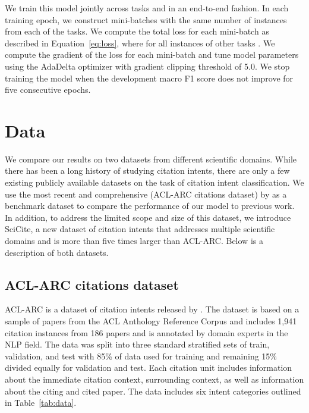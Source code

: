 \documentclass[11pt,a4paper]{article}
\newcommand{\acldata}{ACL-ARC\xspace}
\newcommand{\ourdata}{SciCite\xspace}
\begin{document}
We train this model jointly across tasks and in an end-to-end fashion.
In each training epoch, we construct mini-batches with the same number of instances from each of the  tasks. We compute the total loss for each mini-batch as described in Equation~\ref{eq:loss}, where  for all instances of other tasks .
We compute the gradient of the loss for each mini-batch and tune model parameters using the AdaDelta optimizer \cite{zeiler2012adadelta} with gradient clipping threshold of 5.0.
We stop training the model when the development macro F1 score does not improve for five consecutive epochs.



\section{Data}
\label{sec:data}


We compare our results on two datasets from different scientific domains. While there has been a long history of studying citation intents, there are only a few existing publicly available datasets on the task of citation intent classification. We use the most recent and comprehensive (\acldata citations dataset) by \citet{jurgens2018} as a benchmark dataset to compare the performance of our model to previous work. In addition, to address the limited scope and size of this dataset, we introduce \ourdata, a new dataset of citation intents that addresses multiple scientific domains and is more than five times larger than \acldata.
Below is a description of both datasets.



\subsection{ACL-ARC citations dataset}
\acldata is a dataset of citation intents released by \citet{jurgens2018}. The dataset is based on a sample of papers from the ACL Anthology Reference Corpus \cite{Bird2008TheAA} and includes 1,941 citation instances from 186 papers and is annotated by domain experts in the NLP field. The data was split into three standard stratified sets of train, validation, and test with 85\% of data used for training and remaining 15\% divided equally for validation and test. Each citation unit includes information about the immediate citation context, surrounding context, as well as information about the citing and cited paper. The data includes six intent categories outlined in Table~\ref{tab:data}.
\end{document}
